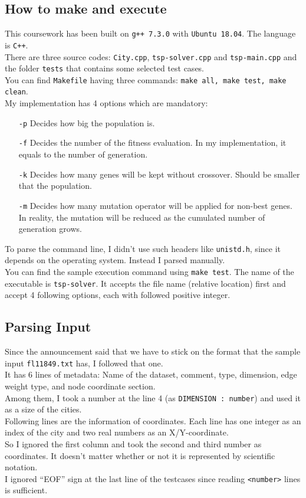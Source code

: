 \documentclass[11pt]{article}
\begin{document}
\subsection{How to make and execute} \label{ssec:1.1}
This coursework has been built on \texttt{g++ 7.3.0} with \texttt{Ubuntu 18.04}. The language is \texttt{C++}. \\
There are three source codes: \texttt{City.cpp}, \texttt{tsp-solver.cpp} and \texttt{tsp-main.cpp} and the folder \texttt{tests} that contains some selected test cases. \\
You can find \texttt{Makefile} having three commands: \texttt{make all, make test, make clean}. \\
My implementation has 4 options which are mandatory:
\begin{itemize}
	\item[\texttt{-p}] Decides how big the population is.
	\item[\texttt{-f}] Decides the number of the fitness evaluation. In my implementation, it equals to the number of generation.
	\item[\texttt{-k}] Decides how many genes will be kept without crossover. Should be smaller that the population.
	\item[\texttt{-m}] Decides how many mutation operator will be applied for non-best genes. In reality, the mutation will be reduced as the cumulated number of generation grows.
\end{itemize}
To parse the command line, I didn't use such headers like \texttt{unistd.h}, since it depends on the operating system. Instead I parsed manually. \\
You can find the sample execution command using \texttt{make test}. The name of the executable is \texttt{tsp-solver}. It accepts the file name (relative location) first and accept 4 following options, each with followed positive integer.

\subsection{Parsing Input} \label{ssec:1.2}
Since the announcement said that we have to stick on the format that the sample input \texttt{fl11849.txt} has, I followed that one. \\
It has 6 lines of metadata: Name of the dataset, comment, type, dimension, edge weight type, and node coordinate section. \\
Among them, I took a number at the line 4 (as \texttt{DIMENSION : number}) and used it as a size of the cities. \\
Following lines are the information of coordinates. Each line has one integer as an index of the city and two real numbers as an X/Y-coordinate. \\
So I ignored the first column and took the second and third number as coordinates. It doesn't matter whether or not it is represented by scientific notation. \\
I ignored ``EOF'' sign at the last line of the testcases since reading \texttt{<number>} lines is sufficient.
\end{document}
